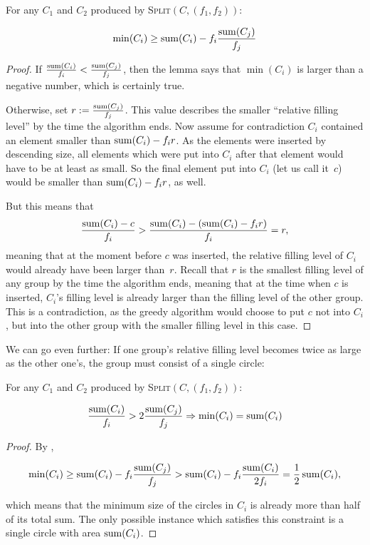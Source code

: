 \documentclass[a4paper,style=print,bibliography=totoc,nexus,lnum,extramargin]{tubsbook}
\begin{document}
\begin{lemma}\label{th:min1}
    For any $C_1$ and $C_2$ produced by \textsc{Split}$(C,(f_1,f_2))$:

    $$\min(C_i) \ge \operatorname{sum}(C_i) - f_i\frac{\operatorname{sum}(C_j)}{f_j}$$
\end{lemma}

\begin{proof}
    If $\frac{\operatorname{sum}(C_i)}{f_i} < \frac{\operatorname{sum}(C_j)}{f_j}$, then the lemma says that $\min(C_i)$ is larger than a negative number, which is certainly true.

    Otherwise, set $r := \frac{\operatorname{sum}(C_j)}{f_j}$. This value describes the smaller “relative filling level” by the time the algorithm ends.
    Now assume for contradiction $C_i$ contained an element smaller than $\operatorname{sum}(C_i) - f_i r$. As the elements were inserted by descending size, all elements which were put into $C_i$ after that element would have to be at least as small. So the final element put into $C_i$ (let us call it~$c$) would be smaller than $\operatorname{sum}(C_i) - f_i r$, as well.

    But this means that $$\frac{\operatorname{sum}(C_i) - c}{f_i} > \frac{\operatorname{sum}(C_i) - (\operatorname{sum}(C_i) - f_i r)}{f_i} = r,$$ meaning that at the moment before $c$ was inserted, the relative filling level of $C_i$ would already have been larger than~$r$.
    Recall that $r$ is the smallest filling level of any group by the time the algorithm ends, meaning that at the time when $c$ is inserted, $C_i$'s filling level is already larger than the filling level of the other group.
    This is a contradiction, as the greedy algorithm would choose to put $c$ not into $C_i$, but into the other group with the smaller filling level in this case.
\end{proof}

We can go even further: If one group's relative filling level becomes twice as large as the other one's, the group must consist of a single circle:

\begin{lemma}\label{th:min2}
    For any $C_1$ and $C_2$ produced by \textsc{Split}$(C,(f_1,f_2))$:

    $$\frac{\operatorname{sum}(C_i)}{f_i} > 2\frac{\operatorname{sum}(C_j)}{f_j} \Rightarrow \min(C_i) = \operatorname{sum}(C_i)$$
\end{lemma}

\begin{proof}
    By ,

    $$\min(C_i) \ge \operatorname{sum}(C_i) - f_i\frac{\operatorname{sum}(C_j)}{f_j} > \operatorname{sum}(C_i) - f_i\frac{\operatorname{sum}(C_i)}{2f_i} = \frac{1}{2}\operatorname{sum}(C_i),$$

    which means that the minimum size of the circles in $C_i$ is already more than half of its total sum. The only possible instance which satisfies this constraint is a single circle with area $\operatorname{sum}(C_i)$.

\end{proof}
\end{document}
